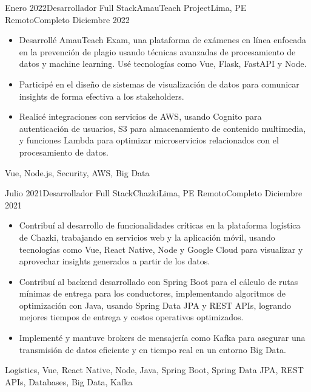 \begin{experiences}
\emptySeparator
\experience
  {Enero 2022}{Desarrollador Full Stack}{AmauTeach Project}{Lima, PE}
  {Remoto}{Completo}
  {Diciembre 2022} {
    \begin{itemize}
      \item Desarrollé AmauTeach Exam, una plataforma de exámenes en línea enfocada en la prevención de plagio usando técnicas avanzadas de procesamiento de datos y machine learning. Usé tecnologías como Vue, Flask, FastAPI y Node.
      \item Participé en el diseño de sistemas de visualización de datos para comunicar insights de forma efectiva a los stakeholders.
      \item Realicé integraciones con servicios de AWS, usando Cognito para autenticación de usuarios, S3 para almacenamiento de contenido multimedia, y funciones Lambda para optimizar microservicios relacionados con el procesamiento de datos.
    \end{itemize}
  }
  {Vue, Node.js, Security, AWS, Big Data}

\emptySeparator
\experience
  {Julio 2021}{Desarrollador Full Stack}{Chazki}{Lima, PE}
  {Remoto}{Completo}
  {Diciembre 2021} {
    \begin{itemize}
      \item Contribuí al desarrollo de funcionalidades críticas en la plataforma logística de Chazki, trabajando en servicios web y la aplicación móvil, usando tecnologías como Vue, React Native, Node y Google Cloud para visualizar y aprovechar insights generados a partir de los datos.
      \item Contribuí al backend desarrollado con Spring Boot para el cálculo de rutas mínimas de entrega para los conductores, implementando algoritmos de optimización con Java, usando Spring Data JPA y REST APIs, logrando mejores tiempos de entrega y costos operativos optimizados.
      \item Implementé y mantuve brokers de mensajería como Kafka para asegurar una transmisión de datos eficiente y en tiempo real en un entorno Big Data.
    \end{itemize}
  }
  {Logistics, Vue, React Native, Node, Java, Spring Boot, Spring Data JPA, REST APIs, Databases, Big Data, Kafka}


\end{experiences}
